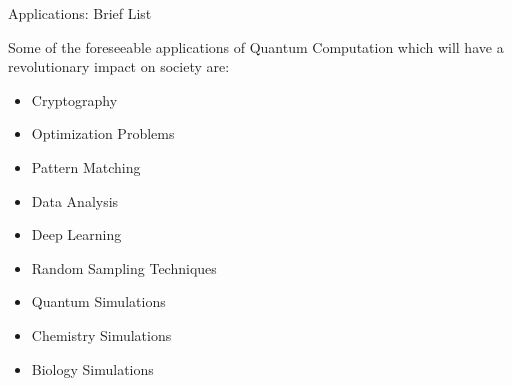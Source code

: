 \documentclass[9pt, handout, aspectratio=169]{beamer}		%
\begin{document}
	\begin{frame}{Applications: Brief List}
	
		Some of the foreseeable applications of Quantum Computation which will have a revolutionary impact on society are:
		
		\begin{multicols}{2}
			\begin{itemize}
				\item<2->{ Cryptography }
				\item<3->{ Optimization Problems }
				\item<4->{ Pattern Matching }
				\item<4->{ Data Analysis }
				\item<5->{ Deep Learning }
				\item<5->{ Random Sampling Techniques }
				\item<6->{ Quantum Simulations }
				\item<6->{ Chemistry Simulations }
				\item<6->{ Biology Simulations }
			\end{itemize}
			
			\columnbreak
		\end{multicols}
	
	\end{frame}		
	
\end{document}
